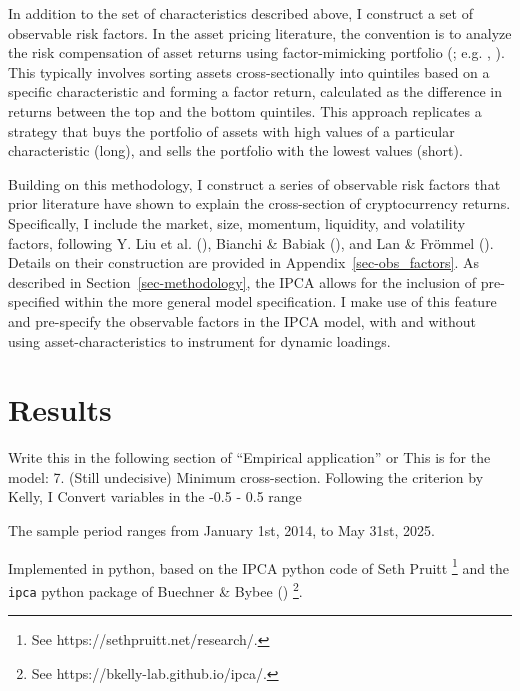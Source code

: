 \documentclass[
  12pt,
  a4paper,
  openany]{scrbook}
\begin{document}
In addition to the set of characteristics described above, I construct a
set of observable risk factors. In the asset pricing literature, the
convention is to analyze the risk compensation of asset returns using
factor-mimicking portfolio
(; e.g.
,
). This typically involves
sorting assets cross-sectionally into quintiles based on a specific
characteristic and forming a factor return, calculated as the difference
in returns between the top and the bottom quintiles. This approach
replicates a strategy that buys the portfolio of assets with high values
of a particular characteristic (long), and sells the portfolio with the
lowest values (short).

Building on this methodology, I construct a series of observable risk
factors that prior literature have shown to explain the cross-section of
cryptocurrency returns. Specifically, I include the market, size,
momentum, liquidity, and volatility factors, following Y. Liu et al.
(), Bianchi \& Babiak
(), and Lan \& Frömmel
(). Details on their construction
are provided in Appendix~\ref{sec-obs_factors}. As described in
Section~\ref{sec-methodology}, the IPCA allows for the inclusion of
pre-specified within the more general model specification. I make use of
this feature and pre-specify the observable factors in the IPCA model,
with and without using asset-characteristics to instrument for dynamic
loadings.


\chapter{Results}\label{results}

Write this in the following section of ``Empirical application'' or This
is for the model: 7. (Still undecisive) Minimum cross-section. Following
the criterion by Kelly, I Convert variables in the -0.5 - 0.5 range

The sample period ranges from January 1st, 2014, to May 31st, 2025.

Implemented in python, based on the IPCA python code of Seth Pruitt
\footnote{See https://sethpruitt.net/research/.} and the \texttt{ipca}
python package of Buechner \& Bybee ()
\footnote{See https://bkelly-lab.github.io/ipca/.}.
\end{document}
